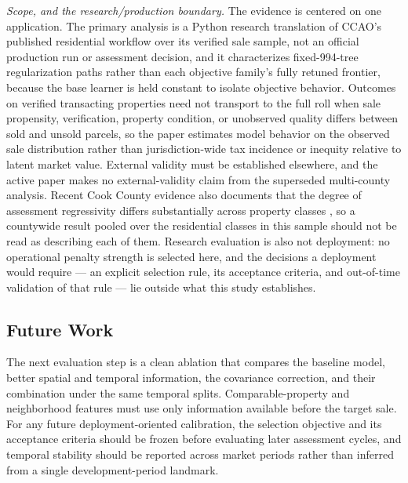\documentclass[10pt]{article}
\theoremstyle{definition}
\newcommand{\1}{\mathbf{1}}
\begin{document}
\emph{Scope, and the research/production boundary.} The evidence is centered on one
application. The primary analysis is a Python research translation of CCAO's published residential
workflow over its verified sale sample, not an official production run or assessment decision, and
it characterizes fixed-994-tree regularization paths rather than each objective family's fully
retuned frontier, because the base learner is held constant to isolate objective behavior.
Outcomes on verified transacting properties need not transport to the full roll when sale
propensity, verification, property condition, or unobserved quality differs between sold and unsold
parcels, so the paper estimates model behavior on the observed sale distribution rather than
jurisdiction-wide tax incidence or inequity relative to latent market value. External validity must
be established elsewhere, and the active paper makes no external-validity claim from the superseded
multi-county analysis. Recent Cook County evidence also documents that the degree of assessment
regressivity differs substantially across property classes \cite{CaiWiley2026}, so a countywide
result pooled over the residential classes in this sample should not be read as describing each of
them. Research evaluation is also not deployment: no operational penalty strength
is selected here, and the decisions a deployment would require --- an explicit selection rule, its
acceptance criteria, and out-of-time validation of that rule --- lie outside what this study
establishes.

\subsection{Future Work}

The next evaluation step is a clean ablation that compares the baseline model, better spatial and temporal information, the covariance correction, and their combination under the same temporal splits. Comparable-property and neighborhood features must use only information available before the target sale.
For any future deployment-oriented calibration, the selection objective and its acceptance criteria should be frozen before evaluating later assessment cycles, and temporal stability should be reported across market periods rather than inferred from a single development-period landmark.
\end{document}
